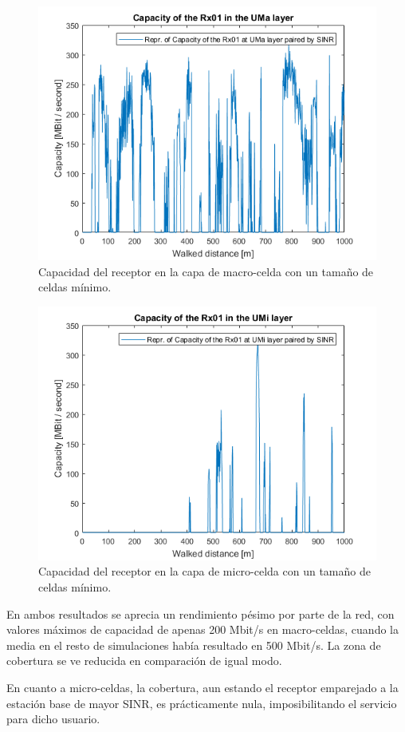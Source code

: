 \begin{figure}[h!]
	\centering
    \includegraphics[width=0.8\linewidth]{imagenes/6_5_capacidad_uma_min.png}
	\caption{Capacidad del receptor en la capa de macro-celda con un tamaño de celdas mínimo.}
	\label{fig:simulacion_sep_min_uma}
\end{figure}

\begin{figure}[h!]
	\centering
    \includegraphics[width=0.8\linewidth]{imagenes/6_5_capacidad_umi_min.png}
	\caption{Capacidad del receptor en la capa de micro-celda con un tamaño de celdas mínimo.}
	\label{fig:simulacion_sep_min_umi}
\end{figure}

En ambos resultados se aprecia un rendimiento pésimo por parte de la red, con valores máximos de capacidad de apenas 200 Mbit/s en macro-celdas, cuando la media en el resto de simulaciones había resultado en 500 Mbit/s. La zona de cobertura se ve reducida en comparación de igual modo.

En cuanto a micro-celdas, la cobertura, aun estando el receptor emparejado a la estación base de mayor SINR, es prácticamente nula, imposibilitando el servicio para dicho usuario.

